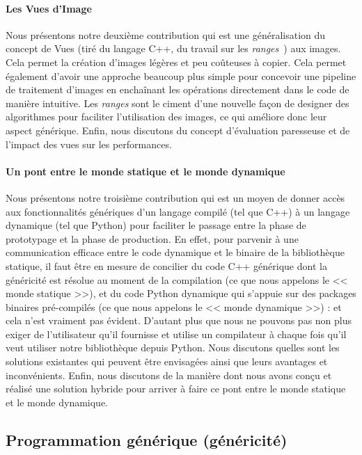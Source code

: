 \paragraph{Les Vues d'Image} Nous présentons notre deuxième contribution qui est une généralisation du concept de Vues
(tiré du langage C++, du travail sur les \emph{ranges}~\parencite{niebler.2018.ranges}) aux images. Cela permet la
création d'images légères et peu coûteuses à copier. Cela permet également d'avoir une approche beaucoup plus simple
pour concevoir une pipeline de traitement d'images en enchaînant les opérations directement dans le code de manière
intuitive. Les \emph{ranges} sont le ciment d'une nouvelle façon de designer des algorithmes pour faciliter
l'utilisation des images, ce qui améliore donc leur aspect générique. Enfin, nous discutons du concept d'évaluation
paresseuse et de l'impact des vues sur les performances.

\paragraph{Un pont entre le monde statique et le monde dynamique} Nous présentons notre troisième contribution qui est
un moyen de donner accès aux fonctionnalités génériques d'un langage compilé (tel que C++) à un langage dynamique (tel
que Python) pour faciliter le passage entre la phase de prototypage et la phase de production. En effet, pour parvenir à
une communication efficace entre le code dynamique et le binaire de la bibliothèque statique, il faut être en mesure de
concilier du code C++ générique dont la généricité est résolue au moment de la compilation (ce que nous appelons le <<
monde statique >>), et du code Python dynamique qui s'appuie sur des packages binaires pré-compilés (ce que nous
appelons le << monde dynamique >>) : et cela n'est vraiment pas évident. D'autant plus que nous ne pouvons pas non plus
exiger de l'utilisateur qu'il fournisse et utilise un compilateur à chaque fois qu'il veut utiliser notre bibliothèque
depuis Python. Nous discutons quelles sont les solutions existantes qui peuvent être envisagées ainsi que leurs
avantages et inconvénients. Enfin, nous discutons de la manière dont nous avons conçu et réalisé une solution hybride
pour arriver à faire ce pont entre le monde statique et le monde dynamique.


\subsection*{Programmation générique (généricité)}


